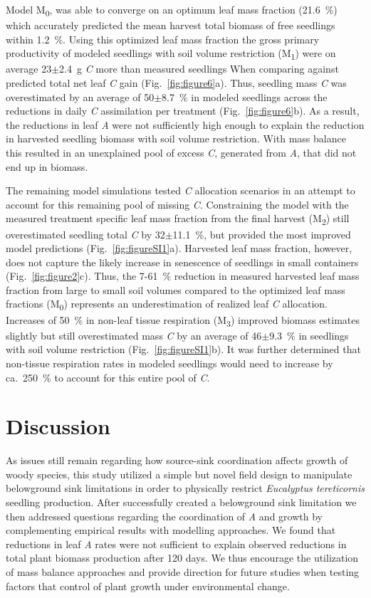 \documentclass[a4paper]{article}\usepackage[]{graphicx}\usepackage[]{color}
\begin{document}
Model M\textsubscript{0}, was able to converge on an optimum leaf mass fraction (21.6~\%) which accurately predicted the mean harvest total biomass of free seedlings within 1.2~\%. Using this optimized leaf mass fraction the gross primary productivity of modeled seedlings with soil volume restriction (M\textsubscript{1}) were on average 23$\pm$2.4~g \textit{C} more than measured seedlings When comparing against predicted total net leaf \textit{C} gain (Fig.~\ref{fig:figure6}a). Thus, seedling mass \textit{C} was overestimated by an average of 50$\pm$8.7~\% in modeled seedlings across the reductions in daily \textit{C} assimilation per treatment (Fig.~\ref{fig:figure6}b). As a result, the reductions in leaf \textit{A} were not sufficiently high enough to explain the reduction in harvested seedling biomass with soil volume restriction. With mass balance this resulted in an unexplained pool of excess \textit{C}, generated from \textit{A}, that did not end up in biomass. 

The remaining model simulations tested \textit{C} allocation scenarios in an attempt to account for this remaining pool of missing \textit{C}. Constraining the model with the measured treatment specific leaf mass fraction from the final harvest (M\textsubscript{2}) still overestimated seedling total \textit{C} by 32$\pm$11.1~\%, but provided the most improved model predictions (Fig.~\ref{fig:figureSI1}a). Harvested leaf mass fraction, however, does not capture the likely increase in senescence of seedlings in small containers (Fig.~\ref{fig:figure2}c). Thus, the 7-61~\% reduction in measured harvested leaf mass fraction from large to small soil volumes compared to the optimized leaf mass fractions (M\textsubscript{0}) represents an underestimation of realized leaf \textit{C} allocation. Increases of 50~\% in non-leaf tissue respiration (M\textsubscript{3}) improved biomass estimates slightly but still overestimated mass \textit{C} by an average of 46$\pm$9.3~\% in seedlings with soil volume restriction (Fig.~\ref{fig:figureSI1}b). It was further determined that non-tissue respiration rates in modeled seedlings would need to increase by ca.~250~\% to account for this entire pool of \textit{C}. 

\section*{Discussion}

As issues still remain regarding how source-sink coordination affects growth of woody species, this study utilized a simple but novel field design to manipulate belowground sink limitations in order to physically restrict \textit{Eucalyptus tereticornis} seedling production. After successfully created a belowground sink limitation we then addressed questions regarding the coordination of \textit{A} and growth by complementing empirical results with modelling approaches. We found that reductions in leaf \textit{A} rates were not sufficient to explain observed reductions in total plant biomass production after 120 days. We thus encourage the utilization of mass balance approaches and provide direction for future studies when testing factors that control of plant growth under environmental change.
\end{document}
